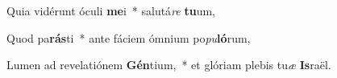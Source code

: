 \item Quia vidérunt óculi \textbf{me}i~* salutá\textit{re} \textbf{tu}um,
\item Quod pa\textbf{rás}ti~* ante fáciem ómnium po\textit{pu}\textbf{ló}rum,
\item Lumen ad revelatiónem \textbf{Gén}tium,~* et glóriam plebis tu\textit{æ} \textbf{Is}raël.
